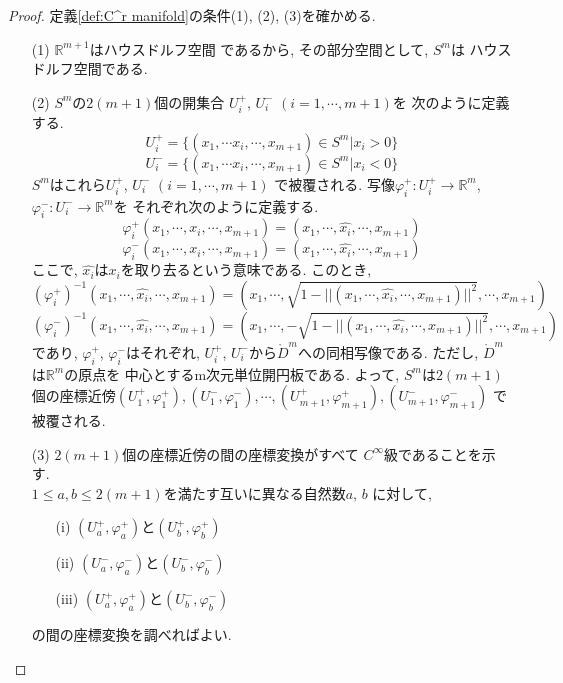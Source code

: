 \documentclass[a4j,12pt]{jarticle}
\theoremstyle{definition}
\begin{document}
\begin{proof}
    定義\ref{def:C^r manifold}の条件(1), (2), (3)を確かめる. 
    \begin{itemize}
        \item[(1)]$\mathbb{R}^{m+1}$はハウスドルフ空間
        であるから, その部分空間として, $S^m$は
        ハウスドルフ空間である. 
        \item[(2)]$S^m$の$2(m+1)$個の開集合
        $U_i^+$, $U_i^-$ $(i=1,\cdots ,m+1)$を
        次のように定義する. 
        $$U_i^+ = \{(x_1, \cdots x_i, \cdots ,x_{m+1})\in S^m|x_i>0\}$$
        $$U_i^- = \{(x_1, \cdots x_i, \cdots ,x_{m+1})\in S^m|x_i<0\}$$
        $S^m$はこれら$U_i^+$, $U_i^-$ $(i=1,\cdots ,m+1)$
        で被覆される. 写像$\varphi_i^+:U_i^+ \rightarrow \mathbb{R}^m$, 
        $\varphi_i^-:U_i^- \rightarrow \mathbb{R}^m$を
        それぞれ次のように定義する. 
        $$\varphi_i^+(x_1,\cdots ,x_i,\cdots, x_{m+1})=(x_1,\cdots ,\hat{x_i},\cdots ,x_{m+1})$$
        $$\varphi_i^-(x_1,\cdots ,x_i,\cdots, x_{m+1})=(x_1,\cdots ,\hat{x_i},\cdots ,x_{m+1})$$
        ここで, $\hat{x_i}$は$x_i$を取り去るという意味である. このとき, 
        $$(\varphi_i^+)^{-1}(x_1,\cdots ,\hat{x_i},\cdots ,x_{m+1})=(x_1,\cdots ,\sqrt{1-||(x_1,\cdots ,\hat{x_i},\cdots ,x_{m+1})||^2},\cdots ,x_{m+1})$$
        $$(\varphi_i^-)^{-1}(x_1,\cdots ,\hat{x_i},\cdots ,x_{m+1})=(x_1,\cdots ,-\sqrt{1-||(x_1,\cdots ,\hat{x_i},\cdots ,x_{m+1})||^2},\cdots ,x_{m+1})$$
        であり, $\varphi_i^+$, $\varphi_i^-$はそれぞれ, $U_i^+$, 
        $U_i^-$から$\mathring{D}^m$への同相写像である.
        ただし, $\mathring{D}^m$は$\mathbb{R}^m$の原点を
        中心とするm次元単位開円板である. 
        よって, $S^m$は$2(m+1)$個の座標近傍$(U_1^+,\varphi_1^+),
        (U_1^-,\varphi_1^-),\cdots ,(U_{m+1}^+,\varphi_{m+1}^+),(U_{m+1}^-,\varphi_{m+1}^-)$
        で被覆される. 
        \item[(3)]$2(m+1)$個の座標近傍の間の座標変換がすべて
        $C^{\infty}$級であることを示す. \\
        $1\leq a, b\leq 2(m+1)$を満たす互いに異なる自然数$a$, $b$
        に対して, 
        \begin{itemize}
            \item[(i)]$(U_a^+,\varphi_a^+)$と$(U_b^+,\varphi_b^+)$
            \item[(ii)]$(U_a^-,\varphi_a^-)$と$(U_b^-,\varphi_b^-)$
            \item[(iii)] $(U_a^+,\varphi_a^+)$と$(U_b^-,\varphi_b^-)$ 
        \end{itemize}
        の間の座標変換を調べればよい. \\

\end{itemize}
\end{proof}
\end{document}
